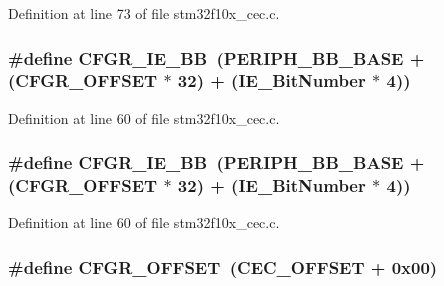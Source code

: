 Definition at line 73 of file stm32f10x\+\_\+cec.\+c.

\subsubsection[{\texorpdfstring{C\+F\+G\+R\+\_\+\+I\+E\+\_\+\+BB}{CFGR_IE_BB}}]{\setlength{\rightskip}{0pt plus 5cm}\#define C\+F\+G\+R\+\_\+\+I\+E\+\_\+\+BB~({\bf P\+E\+R\+I\+P\+H\+\_\+\+B\+B\+\_\+\+B\+A\+SE} + ({\bf C\+F\+G\+R\+\_\+\+O\+F\+F\+S\+ET} $\ast$ 32) + ({\bf I\+E\+\_\+\+Bit\+Number} $\ast$ 4))}\hypertarget{group___c_e_c___private___defines_gac7fe35cf912353ca51a56c5f1f25b2fb}{}\label{group___c_e_c___private___defines_gac7fe35cf912353ca51a56c5f1f25b2fb}


Definition at line 60 of file stm32f10x\+\_\+cec.\+c.

\subsubsection[{\texorpdfstring{C\+F\+G\+R\+\_\+\+I\+E\+\_\+\+BB}{CFGR_IE_BB}}]{\setlength{\rightskip}{0pt plus 5cm}\#define C\+F\+G\+R\+\_\+\+I\+E\+\_\+\+BB~({\bf P\+E\+R\+I\+P\+H\+\_\+\+B\+B\+\_\+\+B\+A\+SE} + ({\bf C\+F\+G\+R\+\_\+\+O\+F\+F\+S\+ET} $\ast$ 32) + ({\bf I\+E\+\_\+\+Bit\+Number} $\ast$ 4))}\hypertarget{group___c_e_c___private___defines_gac7fe35cf912353ca51a56c5f1f25b2fb}{}\label{group___c_e_c___private___defines_gac7fe35cf912353ca51a56c5f1f25b2fb}


Definition at line 60 of file stm32f10x\+\_\+cec.\+c.

\subsubsection[{\texorpdfstring{C\+F\+G\+R\+\_\+\+O\+F\+F\+S\+ET}{CFGR_OFFSET}}]{\setlength{\rightskip}{0pt plus 5cm}\#define C\+F\+G\+R\+\_\+\+O\+F\+F\+S\+ET~({\bf C\+E\+C\+\_\+\+O\+F\+F\+S\+ET} + 0x00)}\hypertarget{group___c_e_c___private___defines_ga8682298330c3b9bae1992e4f1a0af985}{}\label{group___c_e_c___private___defines_ga8682298330c3b9bae1992e4f1a0af985}


